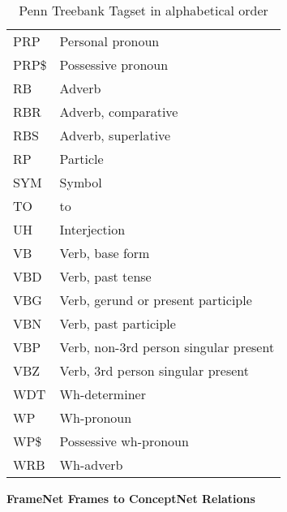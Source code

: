 \begin{table}
\begin{tabular}{|l|l|}
    PRP  & Personal pronoun                         \\
    PRP\$ & Possessive pronoun                       \\
    RB   & Adverb                                   \\
    RBR  & Adverb, comparative                      \\
    RBS  & Adverb, superlative                      \\
    RP   & Particle                                 \\
    SYM  & Symbol                                   \\
    TO   & to                                       \\
    UH   & Interjection                             \\
    VB   & Verb, base form                          \\
    VBD  & Verb, past tense                         \\
    VBG  & Verb, gerund or present participle       \\
    VBN  & Verb, past participle                    \\
    VBP  & Verb, non-3rd person singular present    \\
    VBZ  & Verb, 3rd person singular present        \\
    WDT  & Wh-determiner                            \\
    WP   & Wh-pronoun                               \\
    WP\$ & Possessive wh-pronoun                    \\
    WRB  & Wh-adverb                                \\ \hline
    \end{tabular}
    \caption{Penn Treebank Tagset in alphabetical order}
    \label{tab:penn}
\end{table}

\textbf{FrameNet Frames to ConceptNet Relations}

